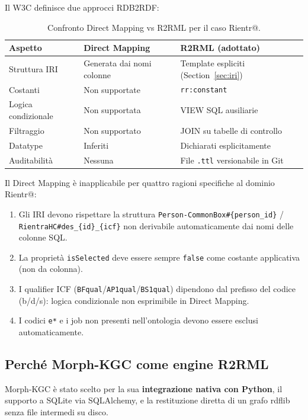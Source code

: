 \documentclass[a4paper,12pt]{article}
\begin{document}
Il W3C definisce due approcci RDB2RDF:

\begin{table}[H]
\centering\small
\caption{Confronto Direct Mapping vs R2RML per il caso Rientr@.}
\begin{tabular}{L{3.8cm} L{3.5cm} L{5cm}}
\toprule
\textbf{Aspetto} & \textbf{Direct Mapping} & \textbf{R2RML (adottato)} \\
\midrule
Struttura IRI & Generata dai nomi colonne & Template espliciti (Section~\ref{sec:iri}) \\
Costanti & Non supportate & \texttt{rr:constant} \\
Logica condizionale & Non supportata & VIEW SQL ausiliarie \\
Filtraggio & Non supportato & JOIN su tabelle di controllo \\
Datatype & Inferiti & Dichiarati esplicitamente \\
Auditabilit\`{a} & Nessuna & File \texttt{.ttl} versionabile in Git \\
\bottomrule
\end{tabular}
\end{table}

Il Direct Mapping \`{e} inapplicabile per quattro ragioni specifiche al
dominio Rientr@:
\begin{enumerate}
  \item Gli IRI devono rispettare la struttura
        \texttt{Person-CommonBox\#\{person\_\allowbreak{}id\}} / \texttt{RientraHC\#des\_\{id\}\_\{icf\}}
        non derivabile automaticamente dai nomi delle colonne SQL.
  \item La propriet\`{a} \texttt{isSelected} deve essere sempre \texttt{false}
        come costante applicativa (non da colonna).
  \item I qualifier ICF (\texttt{BFqual}/\texttt{AP1qual}/\texttt{BS1qual})
        dipendono dal prefisso del codice (b/d/s): logica condizionale non
        esprimibile in Direct Mapping.
  \item I codici \texttt{e*} e i job non presenti nell'ontologia devono
        essere esclusi automaticamente.
\end{enumerate}

\subsection{Perch\'{e} Morph-KGC come engine R2RML}

\begin{infobox}
Morph-KGC \`{e} stato scelto per la sua \textbf{integrazione nativa con
Python}, il supporto a SQLite via SQLAlchemy, e la restituzione diretta
di un grafo rdflib senza file intermedi su disco.
\end{infobox}
\end{document}
